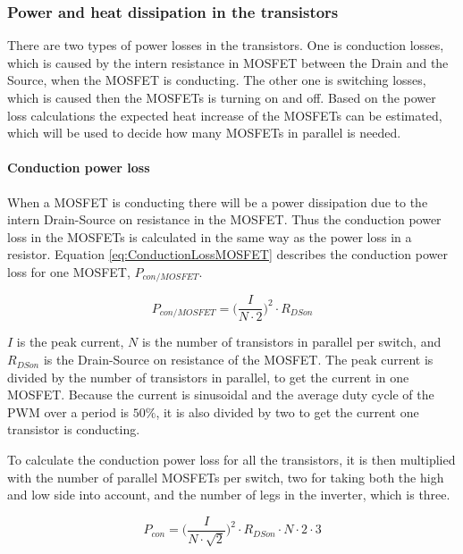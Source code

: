 \subsubsection{Power and heat dissipation in the transistors}
There are two types of power losses in the transistors. One is conduction losses, which is caused by the intern resistance in MOSFET between the Drain and the Source, when the MOSFET is conducting. The other one is switching losses, which is caused then the MOSFETs is turning on and off. Based on the power loss calculations the expected heat increase of the MOSFETs can be estimated, which will be used to decide how many MOSFETs in parallel is needed.

\paragraph{Conduction power loss}
When a MOSFET is conducting there will be a power dissipation due to the intern Drain-Source on resistance in the MOSFET. Thus the conduction power loss in the MOSFETs is calculated in the same way as the power loss in a resistor. Equation \ref{eq:ConductionLossMOSFET} describes the conduction power loss for one MOSFET, $P_{con/MOSFET}$.

    \begin{equation}
        P_{con/MOSFET} = \bigg( \frac{I}{N \cdot 2} \bigg) ^2 \cdot R_{DSon}
        \label{eq:ConductionLossMOSFET}
    \end{equation}

$I$ is the peak current, $N$ is the number of transistors in parallel per switch, and $R_{DSon}$ is the Drain-Source on resistance of the MOSFET.
The peak current is divided by the number of transistors in parallel, to get the current in one MOSFET. Because the current is sinusoidal and the average duty cycle of the PWM over a period is $50 \% $, it is also divided by two to get the current one transistor is conducting.

To calculate the conduction power loss for all the transistors, it is then multiplied with the number of parallel MOSFETs per switch, two for taking both the high and low side into account, and the number of legs in the inverter, which is three.

    \begin{equation}
        P_{con} = \bigg( \frac{I}{N \cdot \sqrt{2}} \bigg) ^2 \cdot R_{DSon} \cdot N \cdot 2 \cdot 3
        \label{eq:ConductionLossTot}
    \end{equation}

